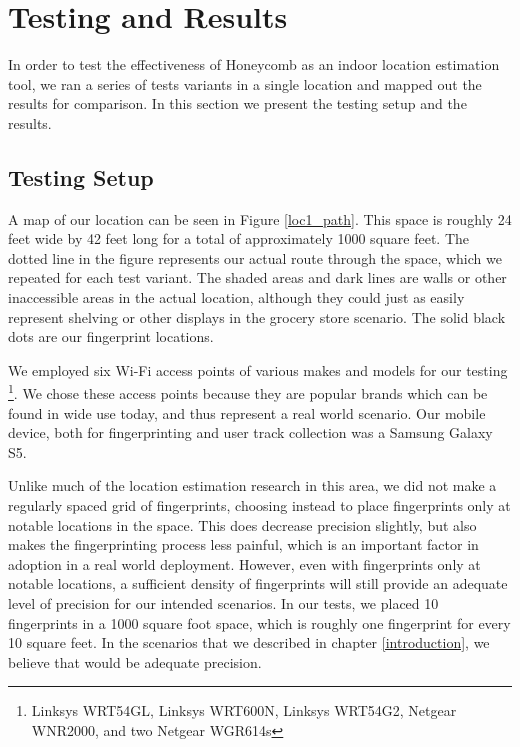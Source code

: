 \chapter{Testing and Results}
\label{results}
%

In order to test the effectiveness of Honeycomb as an indoor location estimation tool, we ran a series of tests variants in a single location and mapped out the results for comparison. In this section we present the testing setup and the results. 


\section{Testing Setup}
%

 A map of our location can be seen in Figure \ref{loc1_path}. This space is roughly 24 feet wide by 42 feet long for a total of approximately 1000 square feet. The dotted line in the figure represents our actual route through the space, which we repeated for each test variant. The shaded areas and dark lines are walls or other inaccessible areas in the actual location, although they could just as easily represent shelving or other displays in the grocery store scenario. The solid black dots are our fingerprint locations.
 
 We employed six Wi-Fi access points of various makes and models for our testing \footnote{Linksys WRT54GL, Linksys WRT600N, Linksys WRT54G2, Netgear WNR2000, and two Netgear WGR614s}. We chose these access points because they are popular brands which can be found in wide use today, and thus represent a real world scenario. Our mobile device, both for fingerprinting and user track collection was a Samsung Galaxy S5. 
 
 Unlike much of the location estimation research in this area, we did not make a regularly spaced grid of fingerprints, choosing instead to place fingerprints only at notable locations in the space. This does decrease precision slightly, but also makes the fingerprinting process less painful, which is an important factor in adoption in a real world deployment. However, even with fingerprints only at notable locations, a sufficient density of fingerprints will still provide an adequate level of precision for our intended scenarios. In our tests, we placed 10 fingerprints in a 1000 square foot space, which is roughly one fingerprint for every 10 square feet. In the scenarios that we described in chapter \ref{introduction}, we believe that would be adequate precision. 


